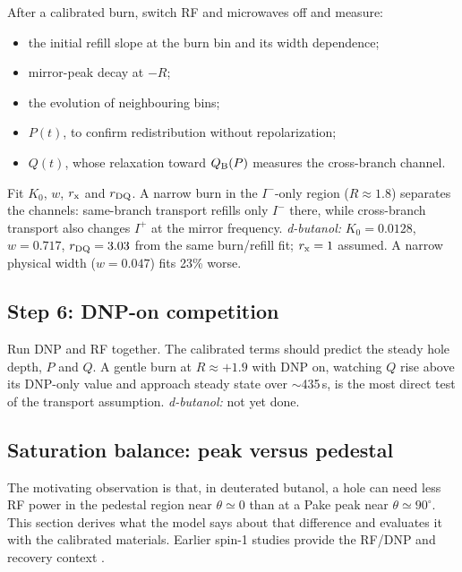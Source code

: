\documentclass[11pt]{article}
\newcommand{\Iplus}{I^{+}}
\newcommand{\Iminus}{I^{-}}
\begin{document}
After a calibrated burn, switch RF and microwaves off and measure:
\begin{itemize}
  \item the initial refill slope at the burn bin and its width dependence;
  \item mirror-peak decay at \(-R\);
  \item the evolution of neighbouring bins;
  \item \(P(t)\), to confirm redistribution without repolarization;
  \item \(Q(t)\), whose relaxation toward \(Q_{\rm B}(P)\) measures the cross-branch channel.
\end{itemize}
Fit \(K_0\), \(w\), \(r_{\rm x}\) and \(r_{\rm DQ}\). A narrow burn in the \(\Iminus\)-only region
(\(R\approx1.8\)) separates the channels: same-branch transport refills only \(\Iminus\) there,
while cross-branch transport also changes \(\Iplus\) at the mirror frequency.
\emph{d-butanol:} \(K_0=0.0128\), \(w=0.717\), \(r_{\rm DQ}=3.03\) from the same burn/refill fit;
\(r_{\rm x}=1\) assumed. A narrow physical width (\(w=0.047\)) fits 23\% worse.

\subsection{Step 6: DNP-on competition}

Run DNP and RF together. The calibrated terms should predict the steady hole depth, \(P\) and
\(Q\). A gentle burn at \(R\approx+1.9\) with DNP on, watching \(Q\) rise above its DNP-only value
and approach steady state over \(\sim\)435\,s, is the most direct test of the transport
assumption. \emph{d-butanol:} not yet done.

\subsection{Saturation balance: peak versus pedestal}
\label{sec:peak-pedestal}

The motivating observation is that, in deuterated butanol, a hole can need less RF power in the
pedestal region near \(\theta\simeq0\) than at a Pake peak near \(\theta\simeq90^\circ\). This
section derives what the model says about that difference and evaluates it with the calibrated
materials. Earlier spin-1 studies provide the RF/DNP and recovery context
\cite{Keller2017,KellerCrabbDay2020,ClementKeller2023,Keller2026}.
\end{document}
